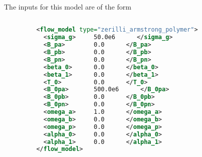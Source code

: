   The inputs for this model are of the form
  \begin{lstlisting}[language=XML]
    
         <flow_model type="zerilli_armstrong_polymer">
           <sigma_g>     50.0e6      </sigma_g>
           <B_pa>        0.0      </B_pa>
           <B_pb>        0.0      </B_pb>
           <B_pn>        0.0      </B_pn>
           <beta_0>      0.0      </beta_0>
           <beta_1>      0.0      </beta_1>
           <T_0>         0.0      </T_0>
           <B_0pa>       500.0e6      </B_0pa>
           <B_0pb>       0.0      </B_0pb>
           <B_0pn>       0.0      </B_0pn>
           <omega_a>     1.0      </omega_a>
           <omega_b>     0.0      </omega_b>
           <omega_p>     0.0      </omega_p>
           <alpha_0>     0.0      </alpha_0>
           <alpha_1>     0.0      </alpha_1>
         </flow_model>

  \end{lstlisting}

